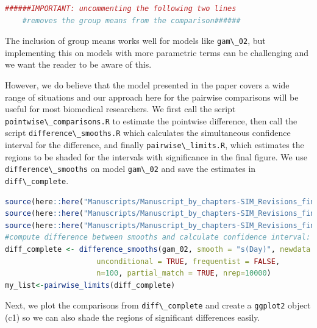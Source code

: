 \documentclass[
]{article}
\newcommand{\passthrough}[1]{#1}
\begin{document}
\begin{lstlisting}[language=R]
######IMPORTANT: uncommenting the following two lines
    #removes the group means from the comparison######
\end{lstlisting}

The inclusion of group means works well for models like \passthrough{\lstinline!gam\_02!}, but implementing this on models with more parametric terms can be challenging and we want the reader to be aware of this.

However, we do believe that the model presented in the paper covers a wide range of situations and our approach here for the pairwise comparisons will be useful for most biomedical researchers. We first call the script \passthrough{\lstinline!pointwise\_comparisons.R!} to estimate the pointwise difference, then call the script \passthrough{\lstinline!difference\_smooths.R!} which calculates the simultaneous confidence interval for the difference, and finally \passthrough{\lstinline!pairwise\_limits.R!}, which estimates the regions to be shaded for the intervals with significance in the final figure. We use \passthrough{\lstinline!difference\_smooths!} on model \passthrough{\lstinline!gam\_02!} and save the estimates in \passthrough{\lstinline!diff\_complete!}.

\begin{lstlisting}[language=R]
source(here::here("Manuscripts/Manuscript_by_chapters-SIM_Revisions_final/scripts","pointwise_comparisons.R"))
source(here::here("Manuscripts/Manuscript_by_chapters-SIM_Revisions_final/scripts","difference_smooths.R"))
source(here::here("Manuscripts/Manuscript_by_chapters-SIM_Revisions_final/scripts","pairwise_limits.R"))
#compute difference between smooths and calculate confidence interval: complete data
diff_complete <- difference_smooths(gam_02, smooth = "s(Day)", newdata = newdat,
                     unconditional = TRUE, frequentist = FALSE,
                     n=100, partial_match = TRUE, nrep=10000)
my_list<-pairwise_limits(diff_complete)
\end{lstlisting}

Next, we plot the comparisons from \passthrough{\lstinline!diff\_complete!} and create a \passthrough{\lstinline!ggplot2!} object (c1) so we can also shade the regions of significant differences easily.
\end{document}
